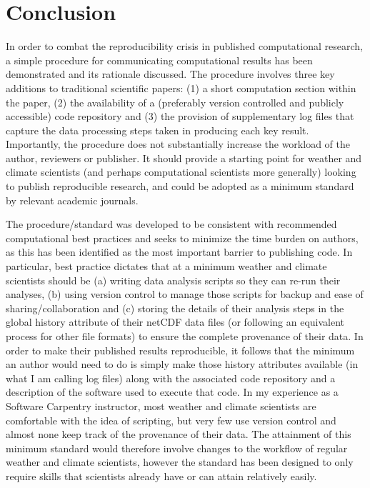 \section{Conclusion}

In order to combat the reproducibility crisis in published computational research, a simple procedure for communicating computational results has been demonstrated \citep{Irving2015} and its rationale discussed. The procedure involves three key additions to traditional scientific papers: (1) a short computation section within the paper, (2) the availability of a (preferably version controlled and publicly accessible) code repository and (3) the provision of supplementary log files that capture the data processing steps taken in producing each key result. Importantly, the procedure does not substantially increase the workload of the author, reviewers or publisher. It should provide a starting point for weather and climate scientists (and perhaps computational scientists more generally) looking to publish reproducible research, and could be adopted as a minimum standard by relevant academic journals.

The procedure/standard was developed to be consistent with recommended computational best practices and seeks to minimize the time burden on authors, as this has been identified as the most important barrier to publishing code. In particular, best practice dictates that at a minimum weather and climate scientists should be (a) writing data analysis scripts so they can re-run their analyses, (b) using version control to manage those scripts for backup and ease of sharing/collaboration and (c) storing the details of their analysis steps in the global history attribute of their netCDF data files (or following an equivalent process for other file formats) to ensure the complete provenance of their data. In order to make their published results reproducible, it follows that the minimum an author would need to do is simply make those history attributes available (in what I am calling log files) along with the associated code repository and a description of the software used to execute that code. In my experience as a Software Carpentry instructor, most weather and climate scientists are comfortable with the idea of scripting, but very few use version control and almost none keep track of the provenance of their data. The attainment of this minimum standard would therefore involve changes to the workflow of regular weather and climate scientists, however the standard has been designed to only require skills that scientists already have or can attain relatively easily.  

